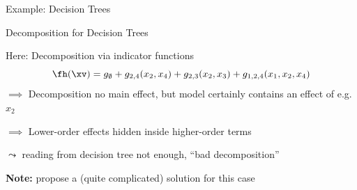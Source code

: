 \documentclass[11pt,compress,t,notes=noshow, aspectratio=169, xcolor=table]{beamer}
\begin{document}
\begin{frame}{Example: Decision Trees}
{\begin{center}
\end{center}
}

    
\end{frame}

\begin{frame}{Decomposition for Decision Trees}
    

Here: Decomposition via indicator functions
$$
\fh(\xv) = g_\emptyset + g_{2,4}(x_2, x_4) + g_{2,3}(x_2, x_3) + g_{1, 2, 4}(x_1, x_2, x_4)
$$
$\implies$ Decomposition no main effect, but model certainly contains an effect of e.g. $x_2$

$\implies$ Lower-order effects hidden inside higher-order terms

$\leadsto$ reading from decision tree not enough, ``bad decomposition''



\pause
\textbf{Note:}  propose a (quite complicated) solution for this case

\end{frame}
\end{document}
